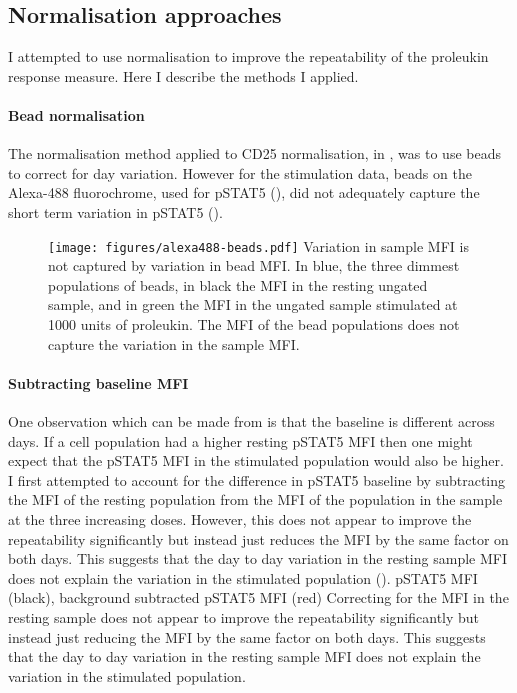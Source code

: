 \subsection{Normalisation approaches}

I attempted to use normalisation to improve the repeatability of the proleukin response measure.
Here I describe the methods I applied.

\paragraph{Bead normalisation} 
The normalisation method applied to CD25 normalisation,
in , was to use beads to correct for day variation.
However for the stimulation data, beads on the Alexa-488 fluorochrome, used for pSTAT5 (),
did not adequately capture the short term variation in pSTAT5 ().  
\begin{figure}[h]
    \centering
    \texttt{[image: figures/alexa488-beads.pdf]}
    {Variation in sample MFI is not captured by variation in bead MFI.}
    {
      In blue, the three dimmest populations of beads, in black the \gls{MFI} in the resting ungated sample, and in green the MFI in the ungated
      sample stimulated at 1000 units of proleukin.
      The MFI of the bead populations does not capture the variation in the sample MFI.
    }
\end{figure} 


\paragraph{ Subtracting baseline MFI }
One observation which can be made from  is that the baseline
is different across days.
If a cell population had a higher resting pSTAT5 MFI then one might expect that the pSTAT5 MFI in the stimulated population would also be higher.
I first attempted to account for the difference in pSTAT5 baseline by subtracting the MFI of the resting population from the MFI of
the population in the sample at the three increasing doses.
However, this does not appear to improve the repeatability significantly but instead just reduces the MFI by the same factor on both days.
This suggests that the day to day variation in the resting sample MFI does not explain the variation in the stimulated population
().
{ pSTAT5 MFI (black), background subtracted pSTAT5 MFI (red) }
{
  Correcting for the MFI in the resting sample does not appear to improve the repeatability significantly but instead just reducing the MFI by
  the same factor on both days.
  This suggests that the day to day variation in the resting sample MFI does not explain the variation in the stimulated population.
}


